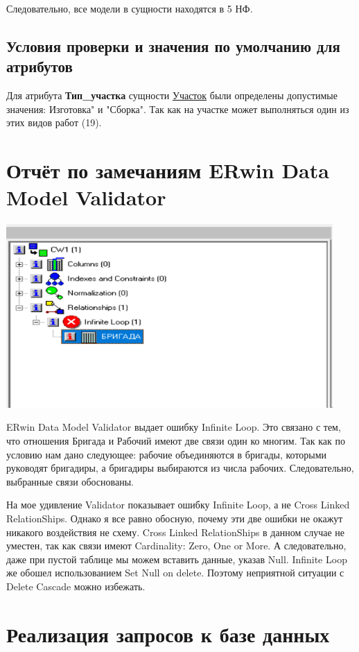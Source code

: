 Следовательно, все модели в сущности находятся в 5 НФ.

\subsection{Условия проверки и значения по умолчанию для атрибутов}

Для атрибута {\bf Тип\_участка} сущности \underline{Участок} были определены допустимые значения: Изготовка" и "Сборка".
Так как на участке может выполняться один из этих видов работ (19).

\section {Отчёт по замечаниям ERwin Data Model Validator}

\includegraphics[height=7cm]{./screenshots/validator/validator.png}

ERwin Data Model Validator выдает ошибку Infinite Loop.
Это связано с тем, что отношения Бригада и Рабочий имеют две связи один ко многим.
Так как по условию нам дано следующее: рабочие объединяются в бригады, которыми руководят бригадиры, а бригадиры выбираются из числа рабочих.
Следовательно, выбранные связи обоснованы.

На мое удивление Validator показывает ошибку Infinite Loop, а не Cross Linked RelationShips.
Однако я все равно обосную, почему эти две ошибки не окажут никакого воздействия не схему.
Cross Linked RelationShips в данном случае не уместен, так как связи имеют Cardinality: Zero, One or More.
А следовательно, даже при пустой таблице мы можем вставить данные, указав Null.
Infinite Loop же обошел использованием Set Null on delete.
Поэтому неприятной ситуации с Delete Cascade можно избежать.

\section{Реализация запросов к базе данных}

